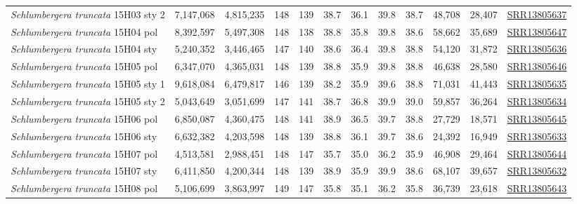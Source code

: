 \documentclass[11pt]{article}
\begin{document}
\begin{supptable}[ht]
{\begin{tabular}{l|cc|cc|cc|cc|cc|c}
\textit{Schlumbergera truncata} 15H03 sty 2 & 7,147,068 & 4,815,235 & 148 & 139 & 38.7 & 36.1 & 39.8 & 38.7 & 48,708 & 28,407 & \href{https://trace.ncbi.nlm.nih.gov/Traces/sra/?run=SRR13805637}{SRR13805637} \\
\textit{Schlumbergera truncata} 15H04 pol   & 8,392,597 & 5,497,308 & 148 & 138 & 38.8 & 35.8 & 39.8 & 38.6 & 58,662 & 35,689 & \href{https://trace.ncbi.nlm.nih.gov/Traces/sra/?run=SRR13805647}{SRR13805647} \\
\textit{Schlumbergera truncata} 15H04 sty   & 5,240,352 & 3,446,465 & 147 & 140 & 38.6 & 36.4 & 39.8 & 38.8 & 54,120 & 31,872 & \href{https://trace.ncbi.nlm.nih.gov/Traces/sra/?run=SRR13805636}{SRR13805636} \\
\textit{Schlumbergera truncata} 15H05 pol   & 6,347,070 & 4,365,031 & 148 & 139 & 38.8 & 35.9 & 39.8 & 38.8 & 46,638 & 28,580 & \href{https://trace.ncbi.nlm.nih.gov/Traces/sra/?run=SRR13805646}{SRR13805646} \\
\textit{Schlumbergera truncata} 15H05 sty 1 & 9,618,084 & 6,479,817 & 146 & 139 & 38.2 & 35.9 & 39.6 & 38.8 & 71,031 & 41,443 & \href{https://trace.ncbi.nlm.nih.gov/Traces/sra/?run=SRR13805635}{SRR13805635} \\
\textit{Schlumbergera truncata} 15H05 sty 2 & 5,043,649 & 3,051,699 & 147 & 141 & 38.7 & 36.8 & 39.9 & 39.0 & 59,857 & 36,264 & \href{https://trace.ncbi.nlm.nih.gov/Traces/sra/?run=SRR13805634}{SRR13805634} \\
\textit{Schlumbergera truncata} 15H06 pol   & 6,850,087 & 4,360,475 & 148 & 141 & 38.9 & 36.5 & 39.7 & 38.8 & 27,729 & 18,571 & \href{https://trace.ncbi.nlm.nih.gov/Traces/sra/?run=SRR13805645}{SRR13805645} \\
\textit{Schlumbergera truncata} 15H06 sty   & 6,632,382 & 4,203,598 & 148 & 139 & 38.8 & 36.1 & 39.7 & 38.6 & 24,392 & 16,949 & \href{https://trace.ncbi.nlm.nih.gov/Traces/sra/?run=SRR13805633}{SRR13805633} \\
\textit{Schlumbergera truncata} 15H07 pol   & 4,513,581 & 2,988,451 & 148 & 147 & 35.7 & 35.0 & 36.2 & 35.9 & 46,908 & 29,464 & \href{https://trace.ncbi.nlm.nih.gov/Traces/sra/?run=SRR13805644}{SRR13805644} \\
\textit{Schlumbergera truncata} 15H07 sty   & 6,411,850 & 4,200,344 & 148 & 139 & 38.9 & 35.9 & 39.9 & 38.6 & 68,107 & 39,657 & \href{https://trace.ncbi.nlm.nih.gov/Traces/sra/?run=SRR13805632}{SRR13805632} \\
\textit{Schlumbergera truncata} 15H08 pol   & 5,106,699 & 3,863,997 & 149 & 147 & 35.8 & 35.1 & 36.2 & 35.8 & 36,739 & 23,618 & \href{https://trace.ncbi.nlm.nih.gov/Traces/sra/?run=SRR13805643}{SRR13805643} \\

\end{tabular}}
\end{supptable}
\end{document}
